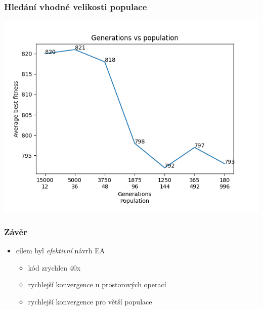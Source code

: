 \documentclass[10pt,xcolor=pdflatex,hyperref={unicode}]{beamer}
\begin{document}
\begin{frame}
\frametitle{Hledání vhodné velikosti populace}
\includegraphics[width=0.8\paperwidth]{img/generations.png}
\end{frame}

\begin{frame}
\frametitle{Závěr}
\doublespacing
\begin{itemize}
    \item cílem byl \emph{efektivní} návrh EA
        \begin{itemize}
            \item kód zrychlen \alert{40x}
            \item rychlejší konvergence u \alert{prostorových operací}
            \item rychlejší konvergence pro \alert{větší populace}
        \end{itemize}
\end{itemize}
\end{frame}


\end{document}
